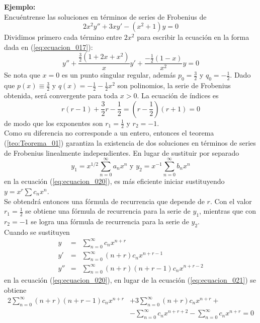 \textbf{Ejemplo:}
\\
Encuéntrense las soluciones en términos de series de Frobenius de
\begin{equation}
2 x^{2} y'' + 3 x y' - (x^{2} + 1) y = 0
\label{eq:ecuacion_020}
\end{equation}
Dividimos primero cada término entre $2x^{2}$ para escribir la ecuación en la forma dada en (\ref{eq:ecuacion_017}):
\begin{equation}
y'' + \dfrac{\frac{3}{2} (1 + 2x + x^{2})}{x} y' + \dfrac{-\frac{1}{2}(1-x)}{x^{2}} y = 0
\label{eq:ecuacion_021}
\end{equation}
Se nota que $x=0$ es un punto singular regular, además $p_{0} = \frac{3}{2}$ y $q_{0} = -\frac{1}{2}$. Dado que $p(x) \equiv \frac{3}{2}$ y $q(x) = - \frac{1}{2} - \frac{1}{2} x^{2}$ son polinomios, la serie de Frobenius obtenida, será convergente para toda $x>0$. La ecuación de índices es
\[ r (r-1) + \frac{3}{2} r - \frac{1}{2} = \left( r - \frac{1}{2} \right)(r+1) = 0 \]
de modo que los exponentes son $r_{1} = \frac{1}{2}$ y $r_{2}=-1$.
\\
Como su diferencia no corresponde a un entero, entonces el teorema (\ref{teo:Teorema_01}) garantiza la existencia de dos soluciones en términos de series de Frobenius linealmente independientes. En lugar de sustituir por separado
\[ y_{1} = x^{1/2} \sum_{n=0}^{\infty} a_{n} x^{n} \mbox{ y } y_{2} = x^{-1} \sum_{n=0}^{\infty} b_{n} x^{n} \]
en la ecuación (\ref{eq:ecuacion_020}), es más eficiente iniciar sustituyendo $y = x^{r} \sum c_{n} x^{n}$.
\\
Se obtendrá entonces una fórmula de recurrencia que depende de $r$. Con el valor $r_{1} = \frac{1}{2}$ se obtiene una fórmula de recurrencia para la serie de $y_{1}$, mientras que con $r_{2} = -1$ se logra una fórmula de recurrencia para la serie de $y_{2}$.
\\
Cuando se sustituyen
\begin{eqnarray*}
y &=& \sum_{n=0}^{\infty} c_{n} x^{n+r} \nonumber \\
y' &=& \sum_{n=0}^{\infty} (n+r) c_{n} x^{n+r-1} \nonumber \\
y'' &=& \sum_{n=0}^{\infty}(n+r)(n+r-1) c_{n} x^{n+r-2} \nonumber
\end{eqnarray*}
en la ecuación (\ref{eq:ecuacion_020}), en lugar de la ecuación (\ref{eq:ecuacion_021}) se obtiene
\begin{equation}
\begin{aligned}
2 \sum_{n=0}^{\infty}(n+r)(n+r-1) c_{n} x^{n+r} &+ 3 \sum_{n=0}^{\infty}(n+r) c_{n} x^{n+r} + \\
&- \sum_{n=0}^{\infty} c_{n} x^{n+r+2} - \sum_{n=0}^{\infty} c_{n} x^{n+r} = 0
\end{aligned}
\label{eq:ecuacion_022}
\end{equation}
